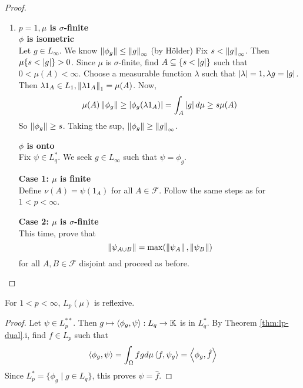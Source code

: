 \documentclass{article}
\begin{document}
\begin{proof}
\begin{enumerate}
    {\bf Case 3: General $n$} \\
    First observe that, for $f \in L_p(\mu)$, $\{f \ne 0\}$ is $\sigma$-finite. Indeed,
    $$\{f \ne 0\} = \Union_n \curlybrack{\frac 1n < \abs f}$$
    and
    $$\mu\curlybrack{\frac 1n < \abs f} \le \abs{n ^ p} \norm f_p^p < \infty \text{ by Markov}$$
    Choose $f_n \in B_{L_p}$ such that $\psi(f_n) \mor \norm\psi$. Then $A = \Union_n\{f_n \ne 0\}$ is $\sigma$-finite and $\norm{\psi_A} = \norm\psi$. By the claim,
    $$\norm\psi = \left(\norm{\psi_A}^q + \norm{\psi_{A^c}}^q\right)^{\frac 1q}$$
    So $\Psi_{A^c} = 0$. By Case 2, find $g \in L_q(\mu_A) \subseteq L_q(\mu)$ such that $\psi_A = \phi_g$, so that
    $$\psi(f) = \psi_A{f\restriction_A} + \psi{A^c}(f\restriction{A^c}) = \int_A fg d\mu + 0 = \int_\Omega fg d\mu$$
    \item {\bf $p = 1, \mu$ is $\sigma$-finite} \\
    {\bf $\phi$ is isometric} \\
    Let $g \in L_\infty$. We know $\left\lVert \phi_g\right\rVert \le \left\lVert g\right\rVert_\infty$ (by Hölder) Fix $s < \left\lVert g\right\rVert_\infty$. Then $\mu\{s < \left\lvert g\right\rvert\} > 0$. Since $\mu$ is $\sigma$-finite, find $A \subseteq \{s < \left\lvert g\right\rvert\}$ such that $0 < \mu(A) < \infty$. Choose a measurable function $\lambda$ such that $\left\lvert \lambda\right\rvert = 1, \lambda g = \left\lvert g\right\rvert$. Then $\lambda 1_A \in L_1, \left\lVert \lambda 1_A\right\rVert_1 = \mu(A)$. Now,
    $$\mu(A)\left\lVert \phi_g\right\rVert \ge \left\lvert \phi_g(\lambda 1_A)\right\rvert = \int_A \left\lvert g\right\rvert d\mu \ge s\mu(A)$$
    So $\left\lVert \phi_g\right\rVert \ge s$. Taking the sup, $\left\lVert \phi_g\right\rVert \ge \left\lVert g\right\rVert_\infty$.

    {\bf $\phi$ is onto} \\
    Fix $\psi \in L_q^*$. We seek $g \in L_\infty$ such that $\psi = \phi_g$.

    {\bf Case 1: $\mu$ is finite} \\
    Define $\nu(A) = \psi(1_A)$ for all $A \in \mathcal F$. Follow the same steps as for $1 < p < \infty$.

    {\bf Case 2: $\mu$ is $\sigma$-finite} \\
    This time, prove that
    $$\left\lVert \psi_{A \cup B}\right\rVert = \max(\left\lVert \psi_A\right\rVert, \left\lVert \psi_B\right\rVert)$$
    for all $A, B \in \mathcal F$ disjoint and proceed as before.
  \end{enumerate}
\end{proof}

\begin{ncor}
  For $1 < p < \infty$, $L_p(\mu)$ is reflexive.
\end{ncor}
\begin{proof}
  Let $\psi \in L_p^{**}$. Then $g \mapsto \left\langle \phi_g, \psi\right\rangle : L_q \rightarrow \mathbb K$ is in $L_q^*$. By Theorem \ref{thm:lp-dual}.i, find $f \in L_p$ such that
  $$\left\langle \phi_g, \psi\right\rangle = \int_\Omega fg d\mu \left\langle f, \psi_g\right\rangle = \left\langle \phi_g, \hat f\right\rangle$$
  Since $L_p^* = \{\phi_g \mid g \in L_q\}$, this proves $\psi = \hat f$.
\end{proof}
\end{document}

